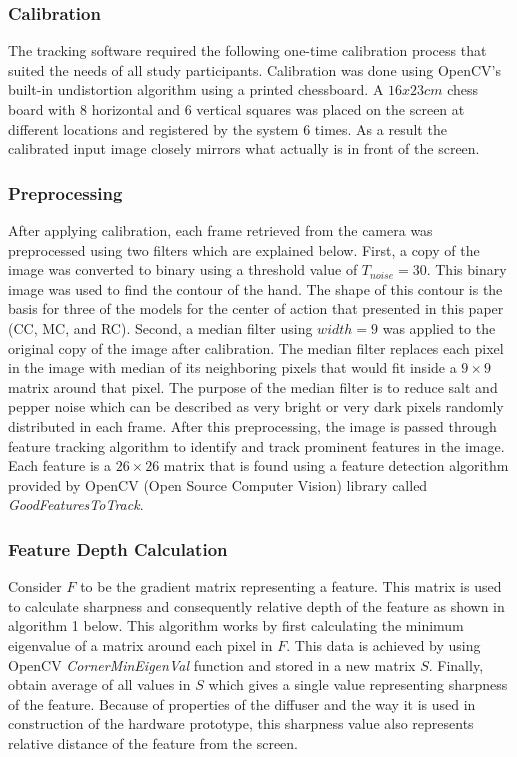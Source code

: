 \subsubsection{Calibration}
The tracking software required the following one-time calibration process that suited the needs of all study participants.
Calibration was done using OpenCV's built-in undistortion algorithm using a printed chessboard.
A $16x23cm$ chess board with 8 horizontal and 6 vertical squares was placed on the screen at different locations and registered by the system 6 times.
As a result the calibrated input image closely mirrors what actually is in front of the screen.

\subsubsection{Preprocessing}
After applying calibration, each frame retrieved from the camera was preprocessed using two filters which are explained below.
First, a copy of the image was converted to binary using a threshold value of $T_{noise} = 30$.
This binary image was used to find the contour of the hand.
The shape of this contour is the basis for three of the models for the center of action that presented in this paper (CC, MC, and RC).
Second, a median filter using $width = 9$ was applied to the original copy of the image after calibration.
The median filter replaces each pixel in the image with median of its neighboring pixels that would fit inside a $9\times9$ matrix around that pixel.
The purpose of the median filter is to reduce salt and pepper noise which can be described as very bright or very dark pixels randomly distributed in each frame.
After this preprocessing, the image is passed through feature tracking algorithm to identify and track prominent features in the image.
Each feature is a $26\times26$ matrix that is found using a feature detection algorithm provided by OpenCV (Open Source Computer Vision) library called \textit{GoodFeaturesToTrack}.

\subsubsection{Feature Depth Calculation}
Consider $F$ to be the gradient matrix representing a feature.
This matrix is used to calculate sharpness and consequently relative depth of the feature as shown in algorithm 1 below.
This algorithm works by first calculating the minimum eigenvalue of a
matrix around each pixel in $F$.
This data is achieved by using OpenCV \textit{CornerMinEigenVal} function and stored in a new matrix $S$.
Finally, obtain average of all values in $S$ which gives a single value representing sharpness of the feature.
Because of properties of the diffuser and the way it is used in construction of the hardware prototype, this sharpness value also represents relative distance of the feature from the screen.

